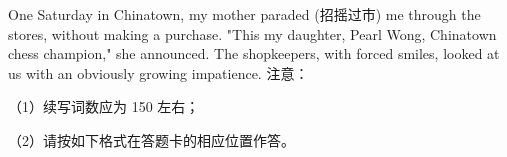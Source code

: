 \documentclass{英语试卷}
\begin{document}
\par One Saturday in Chinatown, my mother paraded (招摇过市) me through the stores, without making a purchase. "This my daughter, Pearl Wong, Chinatown chess champion," she announced. The shopkeepers, with forced smiles, looked at us with an obviously growing impatience. 注意：\par
\par （1）续写词数应为 150 左右；\par
\par （2）请按如下格式在答题卡的相应位置作答。\par
{}
\end{document}
